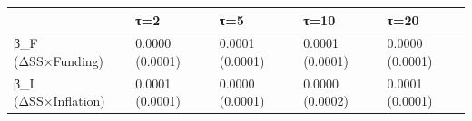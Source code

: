 \begin{tabular}{lllll}
\toprule
 & τ=2 & τ=5 & τ=10 & τ=20 \\
\midrule
β_F (ΔSS×Funding) & 0.0000
(0.0001) & 0.0001
(0.0001) & 0.0001
(0.0001) & 0.0000
(0.0001) \\
β_I (ΔSS×Inflation) & 0.0001
(0.0001) & 0.0000
(0.0001) & 0.0000
(0.0002) & 0.0001
(0.0001) \\
\bottomrule
\end{tabular}
